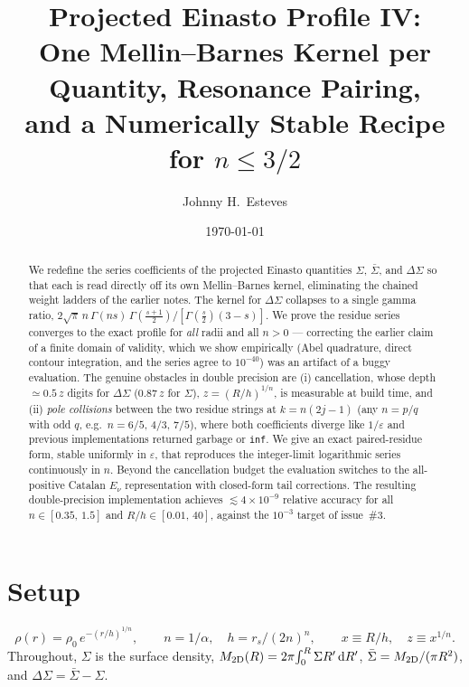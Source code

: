 \documentclass{article}
\title{Projected Einasto Profile IV:\\
One Mellin--Barnes Kernel per Quantity, Resonance Pairing,\\
and a Numerically Stable Recipe for $n\le 3/2$}
\author{Johnny H.~Esteves}
\date{\today}
\begin{document}
\maketitle

\begin{abstract}
We redefine the series coefficients of the projected Einasto quantities
$\Sigma$, $\bar\Sigma$, and $\Delta\Sigma$ so that each is read directly off
its own Mellin--Barnes kernel, eliminating the chained weight ladders of the
earlier notes. The kernel for $\Delta\Sigma$ collapses to a single gamma
ratio, $2\sqrt\pi\,n\,\Gamma(ns)\,\Gamma(\tfrac{s+1}{2})/[\Gamma(\tfrac
s2)(3-s)]$. We prove the residue series converges to the exact profile for
\emph{all} radii and all $n>0$ --- correcting the earlier claim of a finite
domain of validity, which we show empirically (Abel quadrature, direct
contour integration, and the series agree to $10^{-40}$) was an artifact of a
buggy evaluation. The genuine obstacles in double precision are (i)
cancellation, whose depth $\simeq 0.5\,z$ digits for $\Delta\Sigma$
($0.87\,z$ for $\Sigma$), $z=(R/h)^{1/n}$, is measurable at build time, and
(ii) \emph{pole collisions} between the two residue strings at $k = n(2j-1)$
(any $n=p/q$ with odd $q$, e.g.\ $n=6/5,\,4/3,\,7/5$), where both
coefficients diverge like $1/\varepsilon$ and previous implementations
returned garbage or \texttt{inf}. We give an exact paired-residue form,
stable uniformly in $\varepsilon$, that reproduces the integer-limit
logarithmic series continuously in $n$. Beyond the cancellation budget the
evaluation switches to the all-positive Catalan $E_\nu$ representation with
closed-form tail corrections. The resulting double-precision implementation
achieves $\lesssim 4\times10^{-9}$ relative accuracy for all
$n\in[0.35,\,1.5]$ and $R/h\in[0.01,\,40]$, against the $10^{-3}$ target of
issue~\#3.
\end{abstract}

\section{Setup}

\begin{equation}\label{eq:rho}
\rho(r)=\rho_0\,e^{-(r/h)^{1/n}}, \qquad n=1/\alpha,\quad h=r_s/(2n)^n,
\qquad x \equiv R/h,\quad z \equiv x^{1/n}.
\end{equation}
Throughout, $\Sigma$ is the surface density, $M_{\rm 2D}(R)=2\pi\!\int_0^R
\Sigma R'\,{\rm d}R'$, $\bar\Sigma = M_{\rm 2D}/(\pi R^2)$, and
$\Delta\Sigma=\bar\Sigma-\Sigma$.
\end{document}
